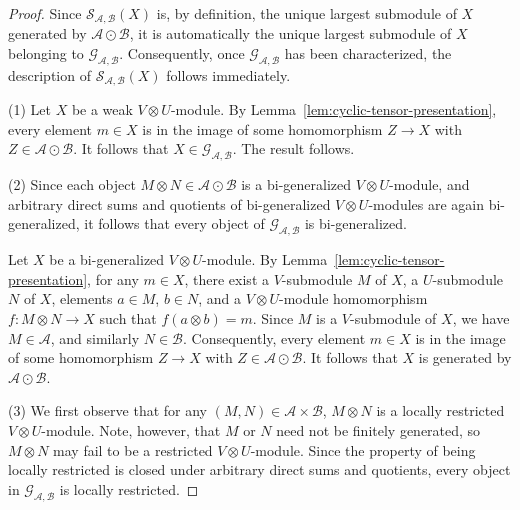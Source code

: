 \documentclass[12pt, english]{article}
\numberwithin{equation}{section}
\theoremstyle{plain}
\theoremstyle{definition}
\theoremstyle{remark}
\begin{document}
	\begin{proof}
		
		Since $\mathcal{S}_{\mathcal{A}, \mathcal{B}}(X)$ is, by definition, the unique largest submodule of $X$ generated by $\mathcal{A}\odot\mathcal{B}$,
		it is automatically the unique largest submodule of $X$ belonging to $\mathcal{G}_{\mathcal{A}, \mathcal{B}}$.
		Consequently, once $\mathcal{G}_{\mathcal{A}, \mathcal{B}}$ has been characterized,
		the description of $\mathcal{S}_{\mathcal{A}, \mathcal{B}}(X)$ follows immediately.
		
		\vspace{0.2cm}
		
		(1) Let $X$ be a weak $V \otimes U$-module. By Lemma~\ref{lem:cyclic-tensor-presentation}, every element $m \in X$ is in the image of some homomorphism $Z \to X$ with $Z \in \mathcal{A}\odot\mathcal{B}$.
		It follows that $X \in \mathcal{G}_{\mathcal{A}, \mathcal{B}}$. The result follows.
		
		\vspace{0.2cm}
		
		(2) Since each object $M\otimes N \in \mathcal{A}\odot\mathcal{B}$ is a bi-generalized $V\otimes U$-module, and arbitrary direct sums and quotients of bi-generalized $V\otimes U$-modules are again bi-generalized, it follows that every object of $\mathcal{G}_{\mathcal{A}, \mathcal{B}}$ is bi-generalized.
		
		Let $X$ be a bi-generalized $V\otimes U$-module. By Lemma~\ref{lem:cyclic-tensor-presentation}, for any $m \in X$, there exist a $V$-submodule $M$ of $X$, a $U$-submodule $N$ of $X$, elements $a \in M$, $b \in N$, and a $V\otimes U$-module homomorphism $f:M\otimes N \to X$ such that $f(a\otimes b) = m$.
		Since $M$ is a $V$-submodule of $X$, we have $M \in \mathcal{A}$, and similarly $N \in \mathcal{B}$.
		Consequently, every element $m \in X$ is in the image of some homomorphism $Z \to X$ with $Z \in \mathcal{A}\odot\mathcal{B}$.
		It follows that $X$ is generated by
		$\mathcal{A}\odot \mathcal{B}$.
		
		\vspace{0.2cm}
		
		(3) We first observe that for any $(M, N) \in \mathcal{A}\times\mathcal{B}$, $M\otimes N$ is a locally restricted $V\otimes U$-module.
		Note, however, that $M$ or $N$ need not be finitely generated, so $M\otimes N$ may fail to be a restricted $V\otimes U$-module.
		Since the property of being locally restricted is closed under arbitrary direct sums and quotients, every object in $\mathcal{G}_{\mathcal{A}, \mathcal{B}}$ is locally restricted.
		

\end{proof}
\end{document}
